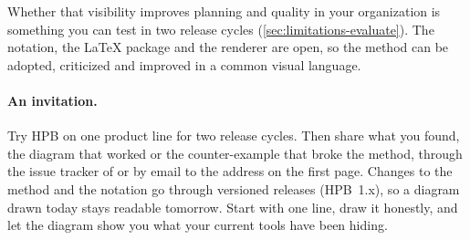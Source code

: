 Whether that visibility improves planning and quality in your organization
is something you can test in two release cycles
(\cref{sec:limitations-evaluate}). The notation, the \LaTeX{} package and
the renderer are open, so the method can be adopted, criticized and
improved in a common visual language.

\paragraph{An invitation.}
Try HPB on one product line for two release cycles. Then share what you
found, the diagram that worked or the counter-example that broke the
method, through the issue tracker of \hpbrepo{} or by email to the
address on the first page. Changes to the method and the notation go
through versioned releases (HPB~1.x), so a diagram drawn today stays
readable tomorrow. Start with one line, draw it honestly, and let the
diagram show you what your current tools have been hiding.
